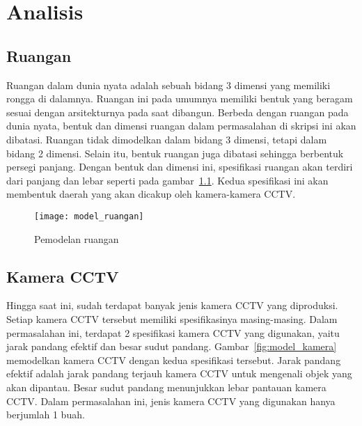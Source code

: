 \chapter{Analisis}
\label{chap:analisis}

\section{Ruangan}
Ruangan dalam dunia nyata adalah sebuah bidang 3 dimensi yang memiliki rongga di dalamnya. Ruangan ini pada umumnya memiliki bentuk yang beragam sesuai dengan arsitekturnya pada saat dibangun. Berbeda dengan ruangan pada dunia nyata, bentuk dan dimensi ruangan dalam permasalahan di skripsi ini akan dibatasi. Ruangan tidak dimodelkan dalam bidang 3 dimensi, tetapi dalam bidang 2 dimensi. Selain itu, bentuk ruangan juga dibatasi sehingga berbentuk persegi panjang. Dengan bentuk dan dimensi ini, spesifikasi ruangan akan terdiri dari panjang dan lebar seperti pada gambar~\ref{fig:model_ruangan}. Kedua spesifikasi ini akan membentuk daerah yang akan dicakup oleh kamera-kamera CCTV.

\begin{figure}[H]
	\centering  
	\texttt{[image: model\_ruangan]}
	\caption[Pemodelan ruangan]{Pemodelan ruangan} 
	\label{fig:model_ruangan}
\end{figure}


\section{Kamera CCTV}
Hingga saat ini, sudah terdapat banyak jenis kamera CCTV yang diproduksi. Setiap kamera CCTV tersebut memiliki spesifikasinya masing-masing. Dalam permasalahan ini, terdapat 2 spesifikasi kamera CCTV yang digunakan, yaitu jarak pandang efektif dan besar sudut pandang. Gambar~\ref{fig:model_kamera} memodelkan kamera CCTV dengan kedua spesifikasi tersebut. Jarak pandang efektif adalah jarak pandang terjauh kamera CCTV untuk mengenali objek yang akan dipantau. Besar sudut pandang menunjukkan lebar pantauan kamera CCTV. Dalam permasalahan ini, jenis kamera CCTV yang digunakan hanya berjumlah 1 buah.

